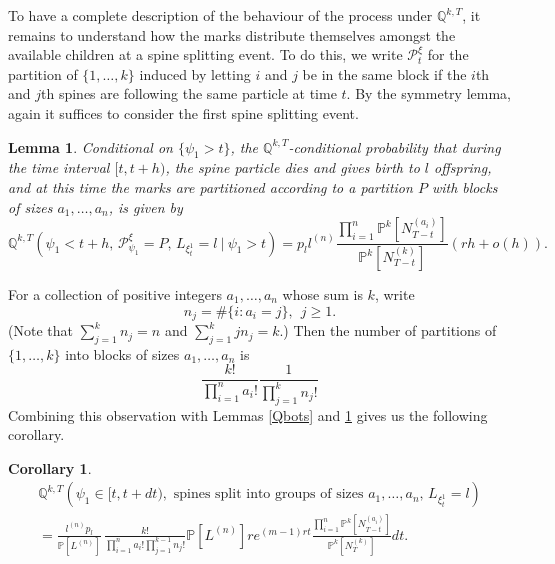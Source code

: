 \documentclass{article}
\theoremstyle{plain}
\newtheorem{cor}[thm]{Corollary}
\newtheorem{lem}[thm]{Lemma}
\theoremstyle{definition}
\newcommand{\Q}{\mathbb{Q}}
\renewcommand{\P}{\mathbb{P}}
\begin{document}
To have a complete description of the behaviour of the process under $\Q^{k,T}$, it remains to understand how the marks distribute themselves amongst the available children at a spine splitting event. To do this, we write $\mathcal P_t^\xi$ for the partition of $\{1,\ldots,k\}$ induced by letting $i$ and $j$ be in the same block if the $i$th and $j$th spines are following the same particle at time $t$. By the symmetry lemma, again it suffices to consider the first spine splitting event.



\begin{lem}\label{Qdescription}
Conditional on $\{ \psi_1 > t \}$, the $\Q^{k,T}$-conditional probability that during the time interval $[t,t+h)$, the spine particle dies and gives birth to $l$ offspring, and at this time the marks are partitioned according to a partition $P$ with blocks of sizes $a_1,\ldots,a_n$, is given by
\[\Q^{k,T} \left( \psi_1 < t+h, \, \mathcal P^\xi_{\psi_1}=P,\, L_{\xi^1_t} = l  ~\Big|~ \psi_1 > t  \right) =  p_l l^{(n)} \frac{\prod_{i=1}^n \P^k [ N_{T-t}^{(a_i)} ]}{ \P^k[N_{T-t}^{(k)} ] } (rh + o(h)).\]
\end{lem}

For a collection of positive integers $a_1,\ldots,a_n$ whose sum is $k$, write
\[n_j = \# \{ i : a_i = j \}, ~~ j \geq 1.\]
(Note that $\sum_{j=1}^k n_j = n$ and $\sum_{j=1}^k j n_j = k$.) Then the number of partitions of $\{1,\ldots, k\}$ into blocks of sizes $a_1,\ldots,a_n$ is
\[\frac{k!}{\prod_{i=1}^n a_i!}\frac{1}{\prod_{j=1}^k n_j!}\]
Combining this observation with Lemmas \ref{Qbots} and \ref{Qdescription} gives us the following corollary.

\begin{cor}\label{Qdesccor}
\begin{multline*}
\Q^{k,T} \left( \psi_1 \in [t, t+dt), \text{ spines split into groups of sizes } a_1,\ldots,a_n,\, L_{\xi^1_t} = l \right)\\
=  \frac{l^{(n)}p_l}{\P[L^{(n)}]}\, \frac{k!}{\prod_{i=1}^n a_i! \prod_{j=1}^{k-1}n_j!} \P[L^{(n)}]re^{(m-1)rt}\frac{\prod_{i=1}^n \P^k [ N_{T-t}^{(a_i)} ]}{ \P^k[N_{T}^{(k)} ] } dt.
\end{multline*}
\end{cor}
\end{document}
